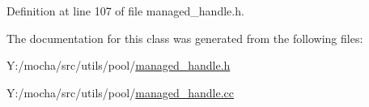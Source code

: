 Definition at line 107 of file managed\_\-handle.h.



The documentation for this class was generated from the following files:\begin{DoxyCompactItemize}
\item 
Y:/mocha/src/utils/pool/\hyperlink{managed__handle_8h}{managed\_\-handle.h}\item 
Y:/mocha/src/utils/pool/\hyperlink{managed__handle_8cc}{managed\_\-handle.cc}\end{DoxyCompactItemize}
